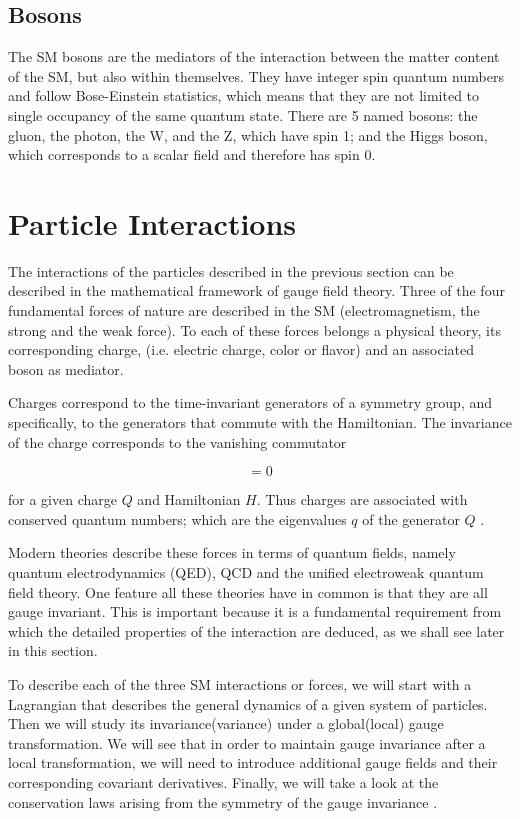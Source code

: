 \subsection{Bosons}
The SM bosons are the mediators of the interaction between the matter content of the SM, but also within themselves. They have integer spin quantum numbers and follow Bose-Einstein statistics, which means that they are not limited to single occupancy of the same quantum state. There are 5 named bosons: the gluon, the photon, the W, and the Z, which have spin 1; and the Higgs boson, which corresponds to a scalar field and therefore has spin 0.

\section{Particle Interactions}
The interactions of the particles described in the previous section can be described in the mathematical framework of gauge field theory. Three of the four fundamental forces of nature are described in the SM (electromagnetism, the strong and the weak force). To each of these forces belongs a physical theory, its corresponding charge, (i.e. electric charge, color or flavor) and an associated boson as mediator. 

Charges correspond to the time-invariant generators of a symmetry group, and specifically, to the generators that commute with the Hamiltonian. The invariance of the charge corresponds to the vanishing commutator

\begin{equation}
[Q, H] = 0
\end{equation}

for a given charge $Q$ and Hamiltonian $H$. Thus charges are associated with conserved quantum numbers; which are the eigenvalues $q$ of the generator $Q$ \cite{wiki:charge}. 

Modern theories describe these forces in terms of quantum fields, namely quantum electrodynamics (QED), QCD and the unified electroweak quantum field theory. One feature all these theories have in common is that they are all gauge invariant. This is important because it is a fundamental requirement from which the detailed properties of the interaction are deduced, as we shall see later in this section.

To describe each of the three SM interactions or forces, we will start with a Lagrangian that describes the general dynamics of a given system of particles. Then we will study its invariance(variance) under a global(local) gauge transformation. We will see that in order to maintain gauge invariance after a local transformation, we will need to introduce additional gauge fields and their corresponding covariant derivatives. Finally, we will take a look at the conservation laws arising from the symmetry of the gauge invariance \cite{Noether1918}.

